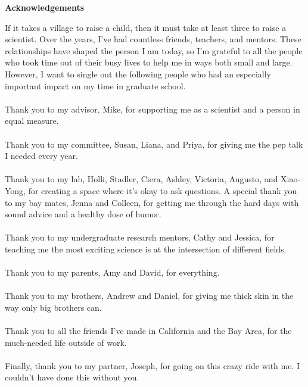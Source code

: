 \documentclass[11pt,letterpaper,oneside]{book}
\begin{document}
\begin{center}
    \bfseries\Large Acknowledgements
\end{center}
\bigskip
If it takes a village to raise a child, then it must take at least three to raise a scientist. Over the years, I've had countless friends, teachers, and mentors. These relationships have shaped the person I am today, so I'm grateful to all the people who took time out of their busy lives to help me in ways both small and large. However, I want to single out the following people who had an especially important impact on my time in graduate school.\\\\
Thank you to my advisor, Mike, for supporting me as a scientist and a person in equal measure.\\\\
Thank you to my committee, Susan, Liana, and Priya, for giving me the pep talk I needed every year.\\\\
Thank you to my lab, Holli, Stadler, Ciera, Ashley, Victoria, Augusto, and Xiao-Yong, for creating a space where it's okay to ask questions. A special thank you to my bay mates, Jenna and Colleen, for getting me through the hard days with sound advice and a healthy dose of humor.\\\\
Thank you to my undergraduate research mentors, Cathy and Jessica, for teaching me the most exciting science is at the intersection of different fields.\\\\
Thank you to my parents, Amy and David, for everything.\\\\
Thank you to my brothers, Andrew and Daniel, for giving me thick skin in the way only big brothers can.\\\\
Thank you to all the friends I've made in California and the Bay Area, for the much-needed life outside of work.\\\\
Finally, thank you to my partner, Joseph, for going on this crazy ride with me. I couldn't have done this without you.
\clearpage

\tableofcontents
\clearpage  %
\setcounter{chapter}{-1}  %
\setcounter{page}{1}  %
\end{document}
